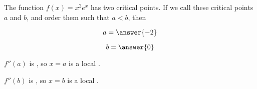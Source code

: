 \documentclass{ximera}
\author{Steven Gubkin}
\begin{document}
\begin{exercise}

The function $f(x) = x^2e^x$ has two critical points.  If we call
these critical points $a$ and $b$, and order them such that $a < b$,
then

$$
a = \answer{-2}
$$

$$
b=\answer{0}
$$

$f''(a)$ is , so $x=a$ is a local .

$f''(b)$ is , so $x=b$ is a local .




\end{exercise}
\end{document}
